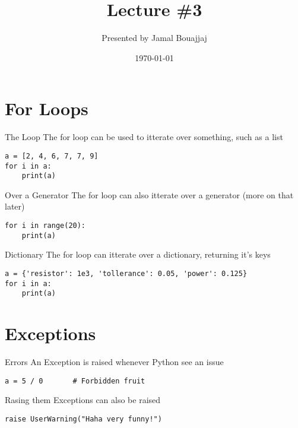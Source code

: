 \documentclass[10pt]{beamer}
\title{Lecture \#3}
\date{\today}
\author{Presented by Jamal Bouajjaj}
\institute{For University of New Haven's Fall 2023 CSCIxx51 Course}
\begin{document}
\maketitle

\section{For Loops}
\begin{frame}[containsverbatim]{The Loop}
    The for loop can be used to itterate over something, such as a list
    \begin{verbatim}
a = [2, 4, 6, 7, 7, 9]
for i in a:
    print(a)
    \end{verbatim}
\end{frame}

\begin{frame}[containsverbatim]{Over a Generator}
    The for loop can also itterate over a generator (more on that later)
    \begin{verbatim}
for i in range(20):
    print(a)
    \end{verbatim}
\end{frame}

\begin{frame}[containsverbatim]{Dictionary}
    The for loop can itterate over a dictionary, returning it's keys
    \begin{verbatim}
a = {'resistor': 1e3, 'tollerance': 0.05, 'power': 0.125}
for i in a:
    print(a)
    \end{verbatim}
\end{frame}

\section{Exceptions}
\begin{frame}[containsverbatim]{Errors}
    An Exception is raised whenever Python see an issue

    \begin{verbatim}
a = 5 / 0       # Forbidden fruit
    \end{verbatim}
\end{frame}

\begin{frame}[containsverbatim]{Rasing them}
    Exceptions can also be raised

    \begin{verbatim}
raise UserWarning("Haha very funny!")
    \end{verbatim}
\end{frame}
\end{document}
